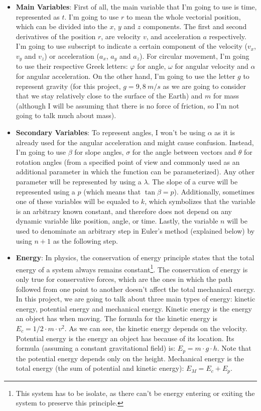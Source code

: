 \documentclass[12pt,twoside,a4paper]{article}
\renewcommand{\phi}{\varphi}
\begin{document}
	\begin{itemize}
		\item \textbf{Main Variables}: First of all, the main variable that I'm going to use is time, represented as $t$. I'm going to use $r$ to mean the whole vectorial position, which can be divided into the $x$, $y$ and $z$ components. The first and second derivatives of the position $r$, are velocity $v$, and acceleration $a$ respectively. I'm going to use subscript to indicate a certain component of the velocity ($v_x$, $v_y$ and $v_z$) or acceleration ($a_x$, $a_y$ and $a_z$). For circular movement, I'm going to use their respective Greek letters: $\phi$ for angle, $\omega$ for angular velocity and $\alpha$ for angular acceleration. On the other hand, I'm going to use the letter $g$ to represent gravity (for this project, $g = 9,8\ m/s$ as we are going to consider that we stay relatively close to the surface of the Earth) and $m$ for mass (although I will be assuming that there is no force of friction, so I'm not going to talk much about mass).
		
		\item \textbf{Secondary Variables}: To represent angles, I won't be using $\alpha$ as it is already used for the angular acceleration and might cause confusion. Instead, I'm going to use $\beta$ for slope angles, $\sigma$ for the angle between vectors and $\theta$ for rotation angles (from a specified point of view and commonly used as an additional parameter in which the function can be parameterized).  Any other parameter will be represented by using a $\lambda$. The slope of a curve will be represented using a $p$ (which means that $\tan \beta = p$). Additionally, sometimes one of these variables will be equaled to $k$, which symbolizes that the variable is an arbitrary known constant, and therefore does not depend on any dynamic variable like position, angle, or time. Lastly, the variable $n$ will be used to denominate an arbitrary step in Euler's method (explained below) by using $n + 1$ as the following step.
		
		\item \textbf{Energy}: In physics, the conservation of energy principle states that the total energy of a system always remains constant\footnote{This system has to be isolate, as there can't be energy entering or exiting the system to preserve this principle.}. The conservation of energy is only true for conservative forces, which are the ones in which the path followed from one point to another doesn't affect the total mechanical energy. In this project, we are going to talk about three main types of energy: kinetic energy, potential energy and mechanical energy. Kinetic energy is the energy an object has when moving. The formula for the kinetic energy is $E_c = 1/2 \cdot m \cdot v^2$. As we can see, the kinetic energy depends on the velocity. Potential energy is the energy an object has because of its location. Its formula (assuming a constant gravitational field) is: $E_p = m \cdot g \cdot h$. Note that the potential energy depends only on the height. Mechanical energy is the total energy (the sum of potential and kinetic energy): $E_M = E_c + E_p$.
		

\end{itemize}
\end{document}
